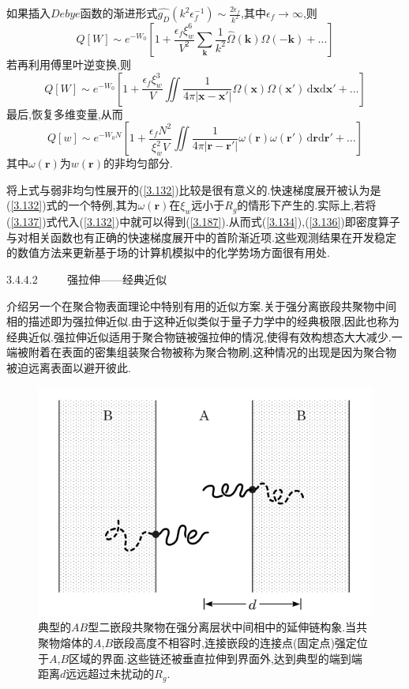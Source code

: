 如果插入$Debye$函数的渐进形式$\hat{g_D}(k^2\epsilon_f^{-1}) \sim \frac{2\epsilon_f}{k^2}$,其中$\epsilon_f \rightarrow  \infty$,则
\begin{equation}
Q[W] \sim e^{-W_0}[1+\frac{\epsilon_f \xi_w^6}{V^2}\sum_{\mathbf{k}}\frac{1}{k^2}\hat{\Omega}(\mathbf{k})\hat{\Omega}(-\mathbf{k})+\dots]\label{3.185}
\end{equation}
若再利用傅里叶逆变换,则
\begin{equation}
Q[W] \sim e^{-W_0}[1+\frac{\epsilon_f \xi_w^3}{V}\iint \frac{1}{4\pi |\mathbf{x}-\mathbf{x}'|}\Omega(\mathbf{x})\Omega(\mathbf{x}')\,\mathrm{d}\mathbf{x}\mathrm{d}\mathbf{x}'+\dots]
\end{equation}
最后,恢复多维变量,从而
\begin{equation}
Q[w] \sim e^{-W_0 N}[1+\frac{\epsilon_f N^2}{\xi_w^2 V}\iint \frac{1}{4\pi |\mathbf{r}-\mathbf{r}'|}\omega(\mathbf{r})\omega(\mathbf{r}')\,\mathrm{d}\mathbf{r}\mathrm{d}\mathbf{r}'+\dots]\label{3.187}
\end{equation}
其中$\omega(\mathbf{r})$为$w(\mathbf{r})$的非均匀部分.

将上式与弱非均匀性展开的(\ref{3.132})比较是很有意义的.快速梯度展开被认为是(\ref{3.132})式的一个特例,其为$\omega(\mathbf{r})$在$\xi_w$远小于$R_g$的情形下产生的.实际上,若将(\ref{3.137})式代入(\ref{3.132})中就可以得到(\ref{3.187}).从而式(\ref{3.134}),(\ref{3.136})即密度算子与对相关函数也有正确的快速梯度展开中的首阶渐近项.这些观测结果在开发稳定的数值方法来更新基于场的计算机模拟中的化学势场方面很有用处.

3.4.4.2 $\qquad$ 强拉伸——经典近似

介绍另一个在聚合物表面理论中特别有用的近似方案.关于强分离嵌段共聚物中间相的描述即为强拉伸近似.由于这种近似类似于量子力学中的经典极限,因此也称为经典近似.强拉伸近似适用于聚合物链被强拉伸的情况,使得有效构想态大大减少.一端被附着在表面的密集组装聚合物被称为聚合物刷,这种情况的出现是因为聚合物被迫远离表面以避开彼此.

\begin{figure}[H]
	\centering
	\includegraphics[scale=0.5]{./figures/FIG3-10.png}
	\caption{典型的$AB$型二嵌段共聚物在强分离层状中间相中的延伸链构象.当共聚物熔体的$A$,$B$嵌段高度不相容时,连接嵌段的连接点(固定点)强定位于$A$,$B$区域的界面.这些链还被垂直拉伸到界面外,达到典型的端到端距离$d$远远超过未扰动的$R_g$.}
	\label{FIG3.10}
\end{figure}

